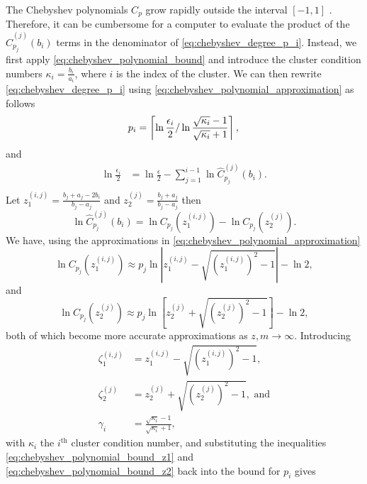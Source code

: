 The Chebyshev polynomials $C_p$ grow rapidly outside the interval $[-1,1]$ \cite[Section 4]{cg_sharpened_convrate_Axelsson1976}. Therefore, it can be cumbersome for a computer to evaluate the product of the $\hat{C}^{(j)}_{p_j}(b_i)$ terms in the denominator of \cref{eq:chebyshev_degree_p_i}. Instead, we first apply \cref{eq:chebyshev_polynomial_bound} and introduce the cluster condition numbers $\kappa_i = \frac{b_i}{a_i}$, where $i$ is the index of the cluster. We can then rewrite \cref{eq:chebyshev_degree_p_i} using \cref{eq:chebyshev_polynomial_approximation} as follows
\begin{equation*}
    p_i  =  \left\lceil\ln{\frac{\epsilon_i}{2}} / \ln{\frac{\sqrt{\kappa_i} - 1}{\sqrt{\kappa_i} + 1}}\right\rceil, \\
\end{equation*}
and
\begin{align*}
    \ln{\frac{\epsilon_i}{2}} & = \ln{\frac{\epsilon}{2}} - \sum_{j=1}^{i-1} \ln{\hat{C}^{(j)}_{p_j}(b_i)}. \\
\end{align*}
Let $z^{(i,j)}_1 = \frac{b_j + a_j - 2b_i}{b_j - a_j}$ and $z^{(j)}_2 = \frac{b_j + a_j}{b_j - a_j}$ then
\begin{equation*}
    \ln{\hat{C}^{(j)}_{p_j}(b_i)} = \ln{C_{p_j}(z^{(i,j)}_1)} - \ln{C_{p_j}(z^{(j)}_2)}.
\end{equation*}
We have, using the approximations in \cref{eq:chebyshev_polynomial_approximation}
\begin{equation}
    \ln{C_{p_j}(z^{(i,j)}_1)} \approx p_j \ln{\left|z^{(i,j)}_1 - \sqrt{\left(z^{(i,j)}_1\right)^2 - 1}\right|} - \ln{2},
    \label{eq:chebyshev_polynomial_bound_z1}
\end{equation}
and
\begin{equation}
    \ln{C_{p_j}(z^{(j)}_2)} \approx p_j \ln{\left[z^{(j)}_2 + \sqrt{\left(z^{(j)}_2\right)^2 - 1}\right]} - \ln{2},
    \label{eq:chebyshev_polynomial_bound_z2}
\end{equation}
both of which become more accurate approximations as $z,m\rightarrow\infty$. Introducing
\begin{align*}
    \zeta^{(i,j)}_1 & = z^{(i,j)}_1 - \sqrt{\left(z^{(i,j)}_1\right)^2 - 1},         \\
    \zeta^{(j)}_2   & = z^{(j)}_2 + \sqrt{\left(z^{(j)}_2\right)^2 - 1}, \text{ and} \\
    \gamma_i             & = \frac{\sqrt{\kappa_i} - 1}{\sqrt{\kappa_i} + 1},
\end{align*}
with $\kappa_i$ the $i^{\text{th}}$ cluster condition number, and substituting the inequalities \ref{eq:chebyshev_polynomial_bound_z1} and \ref{eq:chebyshev_polynomial_bound_z2} back into the bound for $p_i$ gives
